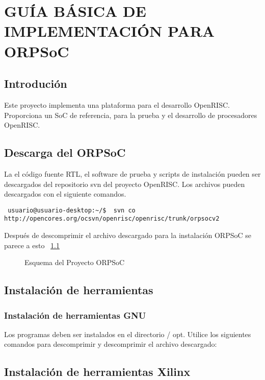 
\chapter{GUÍA BÁSICA  DE IMPLEMENTACIÓN PARA ORPSoC}

 \section{Introdución}
Este proyecto implementa una plataforma para el desarrollo OpenRISC. Proporciona un SoC de referencia, para la prueba y el desarrollo de procesadores OpenRISC.


 \section{Descarga del ORPSoC}
La el código fuente RTL, el software de prueba y scripts de instalación pueden ser descargados del repositorio svn del proyecto OpenRISC. Los archivos pueden descargados con el siguiente comandos.

\begin{verbatim}
 usuario@usuario-desktop:~/$  svn co http://opencores.org/ocsvn/openrisc/openrisc/trunk/orpsocv2
\end{verbatim}

Después de descomprimir el archivo descargado para la instalación ORPSoC se parece a esto ~\ref{fig:esquema} 

\begin{figure}[h!]
 \begin{center}
  \caption{Esquema del Proyecto ORPSoC }
  \label{fig:esquema}
 \end{center}
\end{figure}

 \section{Instalación de herramientas}
 \subsection{Instalación de herramientas GNU}

Los programas deben ser instalados en el directorio / opt. Utilice los siguientes comandos para descomprimir y descomprimir el archivo descargado: 


 \section{Instalación de herramientas Xilinx}

